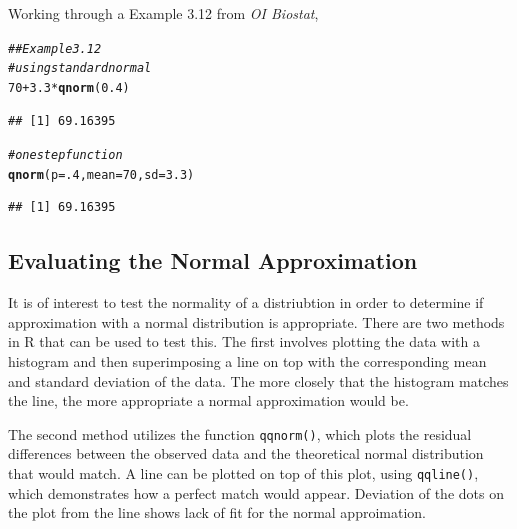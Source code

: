 \documentclass{report}\usepackage[]{graphicx}\usepackage[]{color}
\makeatletter
\newcommand{\hlnum}[1]{\textcolor[rgb]{0.686,0.059,0.569}{#1}}%
\newcommand{\hlcom}[1]{\textcolor[rgb]{0.678,0.584,0.686}{\textit{#1}}}%
\newcommand{\hlopt}[1]{\textcolor[rgb]{0,0,0}{#1}}%
\newcommand{\hlstd}[1]{\textcolor[rgb]{0.345,0.345,0.345}{#1}}%
\newcommand{\hlkwc}[1]{\textcolor[rgb]{0.333,0.667,0.333}{#1}}%
\newcommand{\hlkwd}[1]{\textcolor[rgb]{0.737,0.353,0.396}{\textbf{#1}}}%
\newenvironment{kframe}{%
 \def\at@end@of@kframe{}%
 \ifinner\ifhmode%
  \def\at@end@of@kframe{\end{minipage}}%
  \begin{minipage}{\columnwidth}%
 \fi\fi%
 \def\FrameCommand##1{\hskip\@totalleftmargin \hskip-\fboxsep
 \colorbox{shadecolor}{##1}\hskip-\fboxsep
     \hskip-\linewidth \hskip-\@totalleftmargin \hskip\columnwidth}%
 \MakeFramed {\advance\hsize-\width
   \@totalleftmargin\z@ \linewidth\hsize
   \@setminipage}}%
 {\par\unskip\endMakeFramed%
 \at@end@of@kframe}
\newenvironment{knitrout}{}{} %
\makeatother
\begin{document}
\vspace{.5cm}
Working through a Example 3.12 from \textit{OI Biostat}, 
\begin{knitrout}
\color{fgcolor}\begin{kframe}
\begin{alltt}
\hlcom{## Example 3.12 }
\hlcom{# using standard normal }
\hlnum{70} \hlopt{+} \hlnum{3.3}\hlopt{*}\hlkwd{qnorm}\hlstd{(}\hlnum{0.4}\hlstd{)}
\end{alltt}
\begin{verbatim}
## [1] 69.16395
\end{verbatim}
\begin{alltt}
\hlcom{# one step function }
\hlkwd{qnorm}\hlstd{(}\hlkwc{p} \hlstd{=} \hlnum{.4}\hlstd{,} \hlkwc{mean} \hlstd{=} \hlnum{70}\hlstd{,} \hlkwc{sd} \hlstd{=} \hlnum{3.3}\hlstd{)}
\end{alltt}
\begin{verbatim}
## [1] 69.16395
\end{verbatim}
\end{kframe}
\end{knitrout}

\subsection{Evaluating the Normal Approximation} 
It is of interest to test the normality of a distriubtion in order to determine if approximation with a normal distribution is appropriate. There are two methods in \textsf{R} that can be used to test this.  The first involves plotting the data with a histogram and then superimposing a line on top with the corresponding mean and standard deviation of the data.  The more closely that the histogram matches the line, the more appropriate a normal approximation would be.  

The second method utilizes the function \texttt{qqnorm()}, which plots the residual differences between the observed data and the theoretical normal distribution that would match.  A line can be plotted on top of this plot, using \texttt{qqline()}, which demonstrates how a perfect match would appear.  Deviation of the dots on the plot from the line shows lack of fit for the normal approimation.  
\end{document}
